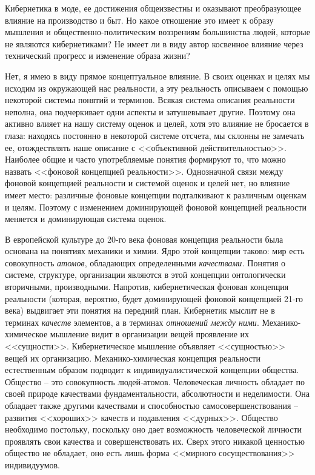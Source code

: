 \documentclass{book}
\begin{document}
Кибернетика в моде, ее достижения общеизвестны и оказы­вают преобразующее влияние на производство и быт. Но какое отношение это имеет к образу мышления и общественно-поли­тическим воззрениям большинства людей, которые не являются кибернетиками? Не имеет ли в виду автор косвенное влияние через технический прогресс и изменение образа жизни?

Нет, я имею в виду прямое концептуальное влияние. В своих оценках и целях мы исходим из окружающей нас реальности, а эту реальность описываем с помощью некоторой системы по­нятий и терминов. Всякая система описания реальности непол­на, она подчеркивает одни аспекты и затушевывает другие. Поэтому она активно влияет на нашу систему оценок и целей, хотя это влияние не бросается в глаза: находясь постоянно в некоторой системе отсчета, мы склонны не замечать ее, отож­дествлять наше описание с <<объективной действительностью>>. Наиболее общие и часто употребляемые понятия формируют то, что можно назвать <<фоновой концепцией реальности>>. Одно­значной связи между фоновой концепцией реальности и систе­мой оценок и целей нет, но влияние имеет место: различные фоновые концепции подталкивают к различным оценкам и це­лям. Поэтому с изменением доминирующей фоновой концепцией реальности меняется и доминирующая система оценок.

В европейской культуре до 20-го века фоновая концепция реальности была основана на понятиях механики и химии. Ядро этой концепции таково: мир есть совокупность \textit{атомов}, обладающих определенными \textit{качествами.}  Понятия о системе, структуре, организации являются в этой концепции онтологически вторичными, производными. Напротив, кибернетическая фоновая концепция реальности (которая, вероятно, будет до­минирующей фоновой концепцией 21-го века) выдвигает эти понятия на передний план. Кибернетик мыслит не в терминах \textit{качеств}  элементов, а в терминах \textit{отношений между ними}. Механико-химическое мышление видит в организации вещей проявление их <<сущности>>. Кибернетическое мышление объяв­ляет <<сущностью>> вещей их организацию.
Механико-химическая концепция реальности естественным образом подводит к индивидуалистической концепции общест­ва. Общество -- это совокупность людей-атомов. Человеческая личность обладает по своей природе качествами фундаменталь­ности, абсолютности и неделимости. Она обладает также дру­гими качествами и способностью самосовершенствования -- развития <<хороших>> качеств и подавления <<дурных>>. Общест­во необходимо постольку, поскольку оно дает возможность человеческой личности проявлять свои качества и совершенст­вовать их. Сверх этого никакой ценностью общество не обла­дает, оно есть лишь форма <<мирного сосуществования>> инди­видуумов.
\end{document}
